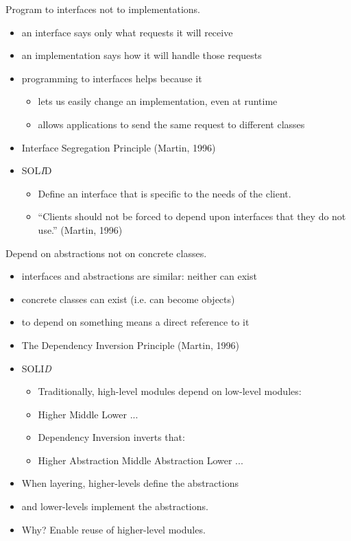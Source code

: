 \documentclass{beamer}
\begin{document}
\begin{frame}{Program to interfaces not to implementations.}
    \begin{itemize}
        \item an interface says only what requests it will receive
        \item an implementation says how it will handle those requests
        \item programming to interfaces helps because it
            \begin{itemize}
                \item lets us easily change an implementation, even at runtime
                \item allows applications to send the same request to different classes
            \end{itemize}
        \item Interface Segregation Principle (Martin, 1996)
        \item SOL\emph{I}D %
            \begin{itemize}
                \item Define an interface that is specific to the needs of the client.
                \item ``Clients should not be forced to depend upon interfaces that they do not use.'' (Martin, 1996)
            \end{itemize}
    \end{itemize}
\end{frame}

\begin{frame}{Depend on abstractions not on concrete classes.}
    \begin{itemize}
        \item interfaces and abstractions are similar: neither can exist
        \item concrete classes can exist (i.e. can become objects)
        \item to depend on something means a direct reference to it
        \item The Dependency Inversion Principle (Martin, 1996)
        \item SOLI\emph{D} %
        \begin{itemize}
            \item Traditionally, high-level modules depend on low-level modules:
            \item Higher \textrightarrow{} Middle \textrightarrow{} Lower \textrightarrow{} ...
            \item Dependency Inversion inverts that:
            \item Higher \textrightarrow{} Abstraction \textleftarrow{} Middle \textrightarrow{} Abstraction \textleftarrow{} Lower ...
        \end{itemize}
        \item When layering, higher-levels define the abstractions
        \item and lower-levels implement the abstractions.
        \item Why? Enable reuse of higher-level modules.
    \end{itemize}
\end{frame}
\end{document}
